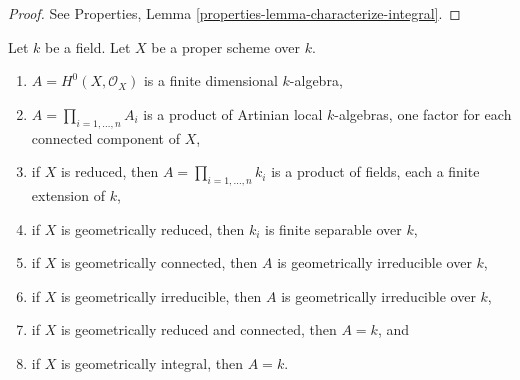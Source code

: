 \begin{proof}
See Properties, Lemma \ref{properties-lemma-characterize-integral}.
\end{proof}

\begin{lemma}
\label{lemma-proper-geometrically-reduced-global-sections}
Let $k$ be a field. Let $X$ be a proper scheme over $k$.
\begin{enumerate}
\item $A = H^0(X, \mathcal{O}_X)$ is a finite dimensional $k$-algebra,
\item $A = \prod_{i = 1, \ldots, n} A_i$ is a product of Artinian
local $k$-algebras, one factor for each connected component of $X$,
\item if $X$ is reduced, then $A = \prod_{i = 1, \ldots, n} k_i$
is a product of fields, each a finite extension of $k$,
\item if $X$ is geometrically reduced, then $k_i$ is finite separable
over $k$,
\item if $X$ is geometrically connected, then $A$ is geometrically
irreducible over $k$,
\item if $X$ is geometrically irreducible, then $A$ is geometrically
irreducible over $k$,
\item if $X$ is geometrically reduced and connected, then $A = k$, and
\item if $X$ is geometrically integral, then $A = k$.
\end{enumerate}
\end{lemma}


